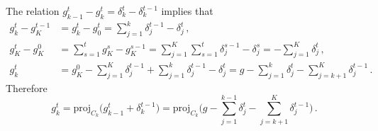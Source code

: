 \documentclass[a4paper]{article}
\begin{document}
The relation $g^t_{k-1} - g^t_k = \delta^t_k - \delta^{t-1}_k$ implies that
\begin{align*}
  g^t_k - g^{t-1}_K
    &= g^t_k - g^t_0
    = \sum_{j=1}^k \delta^{t-1}_j - \delta^t_j
    \,, \\
  g^t_K - g^0_K
    &= \sum_{s=1}^t g^s_K - g^{s-1}_K
    = \sum_{j=1}^K \sum_{s=1}^t \delta^{s-1}_j - \delta^s_j
    = - \sum_{j=1}^K \delta^t_j
    \,, \\
  g^t_k
    &= g^0_K - \sum_{j=1}^K \delta^{t-1}_j + \sum_{j=1}^k \delta^{t-1}_j - \delta^t_j
    = g - \sum_{j=1}^k \delta^t_j - \sum_{j=k+1}^K \delta^{t-1}_j
    \,. 
\end{align*}
Therefore
\begin{equation*}
  g^t_k
    = \mathrm{proj}_{C_k}\bigl(
      g^t_{k-1} + \delta^{t-1}_k
    \bigr)
    = \mathrm{proj}_{C_k}\biggl(
      g - \sum_{j=1}^{k-1} \delta^t_j - \sum_{j=k+1}^K \delta^{t-1}_j
    \biggr)
    \,.
\end{equation*}
\end{document}

